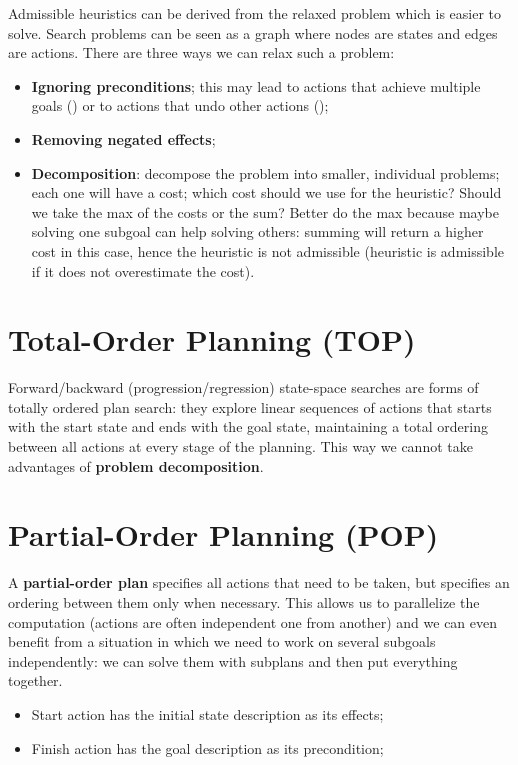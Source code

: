\documentclass{article}
\begin{document}
Admissible heuristics can be derived from the relaxed problem which is easier to solve. Search problems can be seen as a graph where nodes are states and edges are actions. There are three ways we can relax such a problem:

\begin{itemize}
    \item \textbf{Ignoring preconditions}; this may lead to actions that achieve multiple goals (\faThumbsOUp) or to actions that undo other actions (\faThumbsODown);
    \item \textbf{Removing negated effects}; 
    \item \textbf{Decomposition}: decompose the problem into smaller, individual problems; each one will have a cost; which cost should we use for the heuristic? Should we take the max of the costs or the sum? Better do the max because maybe solving one subgoal can help solving others: summing will return a higher cost in this case, hence the heuristic is not admissible (heuristic is admissible if it does not overestimate the cost).
\end{itemize}

\section{Total-Order Planning (TOP)}

Forward/backward (progression/regression) state-space searches are forms of totally ordered plan search: they explore linear sequences of actions that starts with the start state and ends with the goal state, maintaining a total ordering between all actions at every stage of the planning. This way we cannot take advantages of \textbf{problem decomposition}.

\section{Partial-Order Planning (POP)}

A \textbf{partial-order plan} specifies all actions that need to be taken, but specifies an ordering between them only when necessary. This allows us to parallelize the computation (actions are often independent one from another) and we can even benefit from a situation in which we need to work on several subgoals independently: we can solve them with subplans and then put everything together. \\

\begin{itemize}
    \item Start action has the initial state description as its effects;
    \item Finish action has the goal description as its precondition;
\end{itemize}
\end{document}
